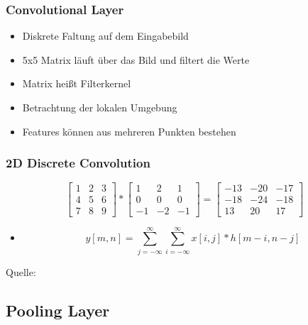 \documentclass{beamer}
\begin{document}
\begin{frame}
	\frametitle{Convolutional Layer}
	 \begin{itemize}
		\item Diskrete Faltung auf dem Eingabebild
		\item 5x5 Matrix läuft über das Bild und filtert die Werte
		\item Matrix heißt Filterkernel
		\item Betrachtung der lokalen Umgebung
		\item Features können aus mehreren Punkten bestehen
	\end{itemize}
	
\end{frame}
\begin{frame}
	\frametitle{2D Discrete Convolution}
	\[
	\begin{bmatrix}
	1 & 2 & 3 \\
	4 & 5 & 6  \\
	7& 8 & 9 
	\end{bmatrix} * 
	\begin{bmatrix}
	1 & 2 & 1 \\
	0 & 0 & 0  \\
	-1& -2 & -1 
	\end{bmatrix} = 
	\begin{bmatrix}
	-13 & -20 & -17 \\
	-18 & -24 & -18  \\
	13& 20 & 17 
	\end{bmatrix}
	\]  
	\begin{itemize}
		\item \[ y[m,n]=\sum_{j=-\infty}^\infty\sum_{i=-\infty}^\infty x[i,j]*h[m-i,n-j]\]
	\end{itemize}
	\hspace*{0pt}\hbox{\scriptsize Quelle:}
\end{frame}



\subsection{Pooling Layer}
\end{document}
